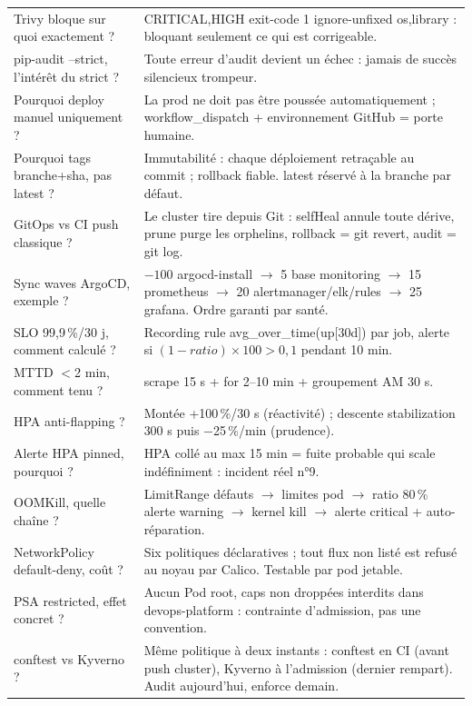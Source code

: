 \documentclass[12pt,a4paper,twoside,openright]{report}
\begin{document}
\begin{longtable}{@{}p{6.2cm}p{8.0cm}@{}}
Trivy bloque sur quoi exactement ? & CRITICAL,HIGH exit-code 1 ignore-unfixed os,library : bloquant seulement ce qui est corrigeable. \\
pip-audit --strict, l'intérêt du strict ? & Toute erreur d'audit devient un échec : jamais de succès silencieux trompeur. \\
Pourquoi deploy manuel uniquement ? & La prod ne doit pas être poussée automatiquement ; workflow\_dispatch + environnement GitHub = porte humaine. \\
Pourquoi tags branche+sha, pas latest ? & Immutabilité : chaque déploiement retraçable au commit ; rollback fiable. latest réservé à la branche par défaut. \\
GitOps vs CI push classique ? & Le cluster tire depuis Git : selfHeal annule toute dérive, prune purge les orphelins, rollback = git revert, audit = git log. \\
Sync waves ArgoCD, exemple ? & $-100$ argocd-install $\rightarrow$ 5 base monitoring $\rightarrow$ 15 prometheus $\rightarrow$ 20 alertmanager/elk/rules $\rightarrow$ 25 grafana. Ordre garanti par santé. \\
SLO 99,9\,\%/30 j, comment calculé ? & Recording rule avg\_over\_time(up[30d]) par job, alerte si $(1-ratio)\times100 > 0,1$ pendant 10 min. \\
MTTD $<$2 min, comment tenu ? & scrape 15 s + for 2--10 min + groupement AM 30 s. \\
HPA anti-flapping ? & Montée +100\,\%/30 s (réactivité) ; descente stabilization 300 s puis $-$25\,\%/min (prudence). \\
Alerte HPA pinned, pourquoi ? & HPA collé au max 15 min = fuite probable qui scale indéfiniment : incident réel n°9. \\
OOMKill, quelle chaîne ? & LimitRange défauts $\rightarrow$ limites pod $\rightarrow$ ratio 80\,\% alerte warning $\rightarrow$ kernel kill $\rightarrow$ alerte critical + auto-réparation. \\
NetworkPolicy default-deny, coût ? & Six politiques déclaratives ; tout flux non listé est refusé au noyau par Calico. Testable par pod jetable. \\
PSA restricted, effet concret ? & Aucun Pod root, caps non droppées interdits dans devops-platform : contrainte d'admission, pas une convention. \\
conftest vs Kyverno ? & Même politique à deux instants : conftest en CI (avant push cluster), Kyverno à l'admission (dernier rempart). Audit aujourd'hui, enforce demain. \\

\end{longtable}
\end{document}
